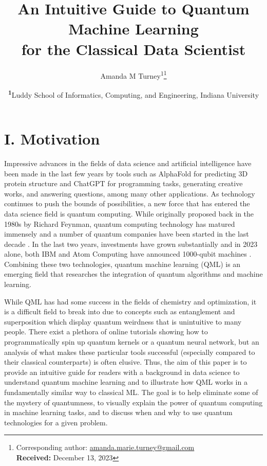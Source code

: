 \documentclass[
	a4paper, %
	10pt, %
	unnumberedsections, %
	twoside, %
]{LTJournalArticle}
\title{An Intuitive Guide to Quantum Machine Learning\\ for the Classical Data Scientist} %
\author{%
	Amanda M Turney\textsuperscript{1}\thanks{Corresponding author: \href{mailto:amanda.marie.turney@gmail.com.com}{amanda.marie.turney@gmail.com}\\ \textbf{Received:} December 13, 2023}
}
\date{\footnotesize\textsuperscript{\textbf{1}}Luddy School of Informatics, Computing, and Engineering, Indiana University\\}
\begin{document}
\maketitle %


\section{I. Motivation}

Impressive advances in the fields of data science and artificial intelligence have been made in the last few years by tools such as AlphaFold \autocite{jumper2021highly} 
for predicting 3D protein structure and ChatGPT \autocite{openai} for programming tasks, generating creative works, and answering questions, among many other applications. As technology 
continues to push the bounds of possibilities, a new force that has entered the data science field is quantum computing. While originally proposed back in the 1980s by Richard Feynman, 
quantum computing technology has matured immensely and a number of quantum companies have been started in the last decade \autocite{quantumhistory}. In the last two years, investments 
have grown substantially and in 2023 alone, both IBM and Atom Computing have announced 1000-qubit machines \autocite{atomcomputing, castelvecchiibm}. Combining these two technologies, 
quantum machine learning (QML) is an emerging field that researches the integration of quantum algorithms and machine learning.

While QML has had some success in the fields of chemistry and optimization, it is a difficult field to break into due to concepts such as entanglement and superposition which display 
quantum weirdness that is unintuitive to many people. There exist a plethora of online tutorials showing how to programmatically spin up quantum kernels or a quantum neural network, 
but an analysis of what makes these particular tools successful (especially compared to their classical counterparts) is often elusive. Thus, the aim of this paper is to provide an 
intuitive guide for readers with a background in data science to understand quantum machine learning and to illustrate how QML works in a fundamentally similar way to classical ML. 
The goal is to help eliminate some of the mystery of quantumness, to visually explain the power of quantum computing in machine learning tasks, and to discuss when and why to use 
quantum technologies for a given problem.
\end{document}
